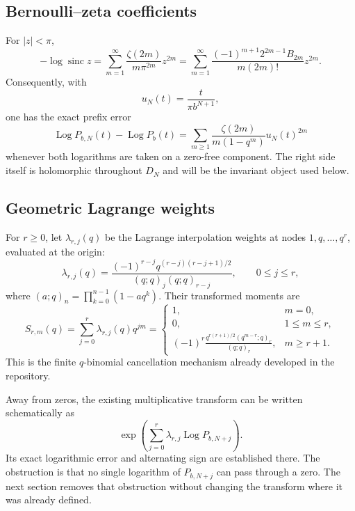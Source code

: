 \documentclass[11pt,oneside]{article}
\numberwithin{equation}{section}
\theoremstyle{frontier}
\theoremstyle{definition}
\theoremstyle{remark}
\newcommand{\sinc}{\operatorname{sinc}}
\newcommand{\Log}{\operatorname{Log}}
\begin{document}
\subsection{Bernoulli--zeta coefficients}

For $|z|<\pi$,
\begin{equation}
 -\log\sinc z
 =\sum_{m=1}^{\infty}\frac{\zeta(2m)}{m\pi^{2m}}z^{2m}
 =\sum_{m=1}^{\infty}
   \frac{(-1)^{m+1}2^{2m-1}B_{2m}}{m(2m)!}z^{2m}.
 \label{eq:log-sinc}
\end{equation}
Consequently, with
\begin{equation}
 u_N(t)=\frac{t}{\pi b^{N+1}},
 \label{eq:uN}
\end{equation}
one has the exact prefix error
\begin{equation}
 \Log P_{b,N}(t)-\Log P_b(t)
 =\sum_{m\ge1}\frac{\zeta(2m)}{m(1-q^m)}u_N(t)^{2m}
 \label{eq:prefix-log-error}
\end{equation}
whenever both logarithms are taken on a zero-free component.  The right side itself is
holomorphic throughout $D_N$ and will be the invariant object used below.

\subsection{Geometric Lagrange weights}

For $r\ge0$, let $\lambda_{r,j}(q)$ be the Lagrange interpolation weights at nodes
$1,q,\ldots,q^r$, evaluated at the origin:
\begin{equation}
 \lambda_{r,j}(q)
 =\frac{(-1)^{r-j}q^{(r-j)(r-j+1)/2}}
       {(q;q)_j(q;q)_{r-j}},
 \qquad 0\le j\le r,
 \label{eq:weights}
\end{equation}
where $(a;q)_n=\prod_{k=0}^{n-1}(1-aq^k)$.  Their transformed moments are
\begin{equation}
 S_{r,m}(q)=\sum_{j=0}^{r}\lambda_{r,j}(q)q^{jm}
 =\begin{cases}
 1,&m=0,\\
 0,&1\le m\le r,\\
 \displaystyle
 (-1)^r\frac{q^{r(r+1)/2}(q^{m-r};q)_r}{(q;q)_r},&m\ge r+1.
 \end{cases}
 \label{eq:transformed-moments}
\end{equation}
This is the finite $q$-binomial cancellation mechanism already developed in the repository.

Away from zeros, the existing multiplicative transform can be written schematically as
\[
 \exp\!\left(\sum_{j=0}^{r}\lambda_{r,j}\Log P_{b,N+j}\right).
\]
Its exact logarithmic error and alternating sign are established there.  The obstruction is
that no single logarithm of $P_{b,N+j}$ can pass through a zero.  The next section removes
that obstruction without changing the transform where it was already defined.
\end{document}
